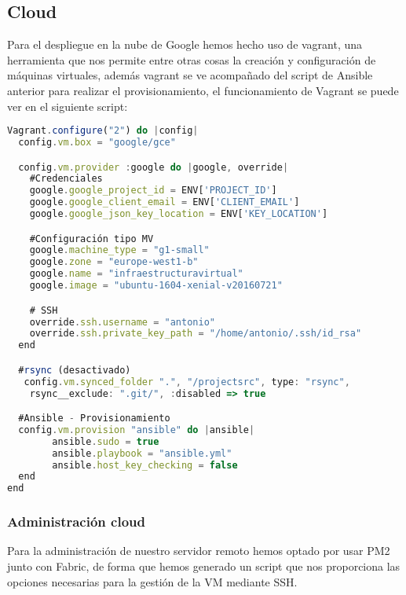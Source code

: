 \subsection {Cloud}
Para el despliegue en la nube de Google hemos hecho uso de vagrant, una herramienta que nos permite entre otras cosas la creación y configuración de máquinas virtuales, además vagrant se ve acompañado del script de Ansible anterior para realizar el provisionamiento, el funcionamiento de Vagrant se puede ver en el siguiente script:

\begin{lstlisting}[language=javascript,caption={Test Unitarios},label={lst:appjs}]
Vagrant.configure("2") do |config|
  config.vm.box = "google/gce"

  config.vm.provider :google do |google, override|
    #Credenciales
    google.google_project_id = ENV['PROJECT_ID']
    google.google_client_email = ENV['CLIENT_EMAIL']
    google.google_json_key_location = ENV['KEY_LOCATION']

    #Configuración tipo MV
    google.machine_type = "g1-small"
    google.zone = "europe-west1-b"
    google.name = "infraestructuravirtual"
    google.image = "ubuntu-1604-xenial-v20160721"

    # SSH
    override.ssh.username = "antonio"
    override.ssh.private_key_path = "/home/antonio/.ssh/id_rsa"
  end

  #rsync (desactivado)
   config.vm.synced_folder ".", "/projectsrc", type: "rsync",
    rsync__exclude: ".git/", :disabled => true

  #Ansible - Provisionamiento
  config.vm.provision "ansible" do |ansible|
        ansible.sudo = true
        ansible.playbook = "ansible.yml"
        ansible.host_key_checking = false
  end
end

\end{lstlisting}

\subsubsection {Administración cloud}
Para la administración de nuestro servidor remoto hemos optado por usar PM2 junto con Fabric, de forma que hemos generado un script que nos proporciona las opciones necesarias para la gestión de la VM mediante SSH.


